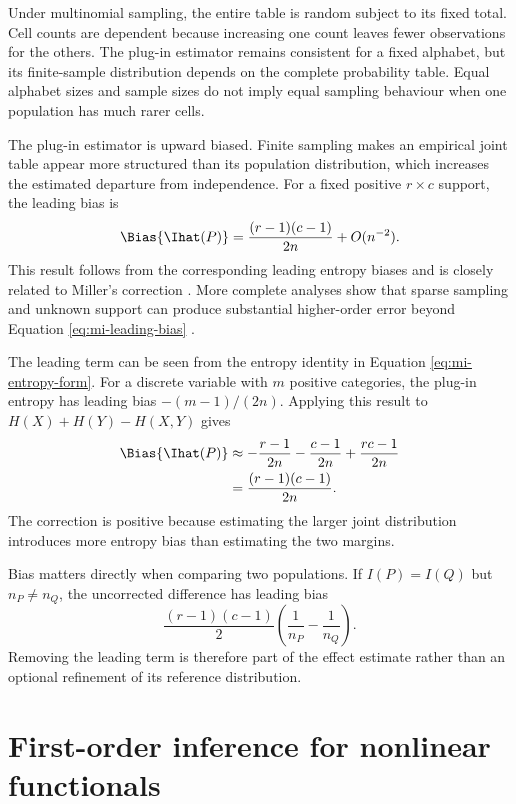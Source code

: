 Under multinomial sampling, the entire table is random subject to its fixed
total. Cell counts are dependent because increasing one count leaves fewer
observations for the others. The plug-in estimator remains consistent for a
fixed alphabet, but its finite-sample distribution depends on the complete
probability table. Equal alphabet sizes and sample sizes do not imply equal
sampling behaviour when one population has much rarer cells.

The plug-in estimator is upward biased. Finite sampling makes an empirical
joint table appear more structured than its population distribution, which
increases the estimated departure from independence. For a fixed positive
\(r\times c\) support, the leading bias is
\begin{equation}
  \Bias\{\Ihat(P)\}
  =\frac{(r-1)(c-1)}{2n}+O(n^{-2}).
  \label{eq:mi-leading-bias}
\end{equation}
This result follows from the corresponding leading entropy biases and is
closely related to Miller's correction \citep{miller1955,moddemeijer1989}.
More complete analyses show that sparse sampling and unknown support can
produce substantial higher-order error beyond Equation
\eqref{eq:mi-leading-bias} \citep{paninski2003}.

The leading term can be seen from the entropy identity in Equation
\eqref{eq:mi-entropy-form}. For a discrete variable with \(m\) positive
categories, the plug-in entropy has leading bias \(-(m-1)/(2n)\). Applying
this result to \(H(X)+H(Y)-H(X,Y)\) gives
\begin{align}
  \Bias\{\Ihat(P)\}
  &\approx
  -\frac{r-1}{2n}
  -\frac{c-1}{2n}
  +\frac{rc-1}{2n}\\
  &=\frac{(r-1)(c-1)}{2n}.
  \label{eq:mi-bias-from-entropies}
\end{align}
The correction is positive because estimating the larger joint distribution
introduces more entropy bias than estimating the two margins.

Bias matters directly when comparing two populations. If
\(I(P)=I(Q)\) but \(n_P\ne n_Q\), the uncorrected difference has leading bias
\begin{equation}
  \frac{(r-1)(c-1)}{2}
  \left(\frac{1}{n_P}-\frac{1}{n_Q}\right).
\end{equation}
Removing the leading term is therefore part of the effect estimate rather than
an optional refinement of its reference distribution.

\section{First-order inference for nonlinear functionals}

